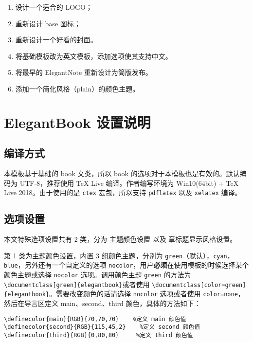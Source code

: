 \documentclass{elegantbook}
\begin{document}
\begin{enumerate}[noitemsep]
   \item 设计一个适合的 LOGO；
   \item 重新设计 base 图标；
   \item 重新设计一个好看的封面。
   \item 将基础模板改为英文模板，添加选项使其支持中文。
   \item 将最早的 ElegantNote 重新设计为简版发布。
   \item 添加一个简化风格（plain）的颜色主题。
\end{enumerate}

\chapter{ElegantBook 设置说明}


\section{编译方式}

本模板基于基础的 book 文类，所以 book 的选项对于本模板也是有效的。默认编码为 UTF-8，推荐使用 \TeX{} Live 编译。作者编写环境为 Win10(64bit) + \TeX{} Live 2018。由于使用的是 \texttt{ctex} 宏包，所以支持 \texttt{pdflatex} 以及 \texttt{xelatex} 编译。


\section{选项设置}
本文特殊选项设置共有 2 类，分为 {\color{main}主题颜色}设置 以及 {\color{main}章标题显示风格}设置。

第 1 类为{\color{main}主题颜色}设置，内置 3 组颜色主题，分别为 \verb|green|（默认），\verb|cyan|，\verb|blue|，另外还有一个自定义的选项 \verb|nocolor|，用户\textbf{必须}在使用模板的时候选择某个颜色主题或选择 \verb|nocolor| 选项。调用颜色主题 \verb|green| 的方法为 \verb|\documentclass[green]{elegantbook}|或者使用 \verb|\documentclass[color=green]{elegantbook}|。需要改变颜色的话请选择 \verb|nocolor| 选项或者使用 \verb|color=none|，然后在导言区定义 main、second、third 颜色，具体的方法如下：
\begin{verbatim}
\definecolor{main}{RGB}{70,70,70}    %定义 main 颜色值
\definecolor{second}{RGB}{115,45,2}    %定义 second 颜色值
\definecolor{third}{RGB}{0,80,80}     %定义 third 颜色值
\end{verbatim}
\end{document}
